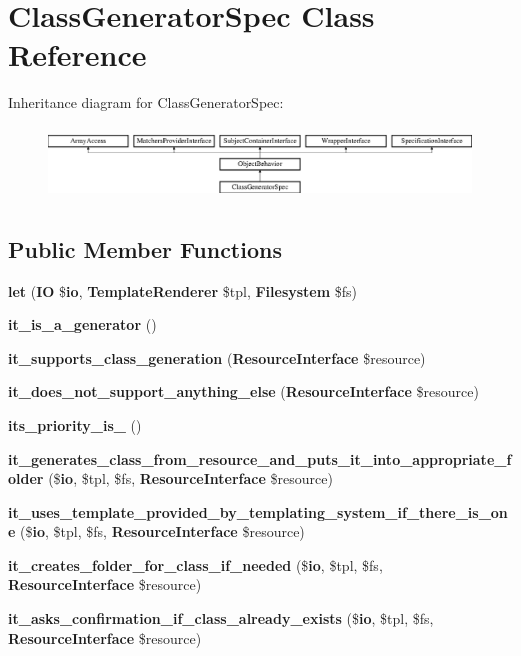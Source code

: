 \section{Class\+Generator\+Spec Class Reference}
\label{classspec_1_1_php_spec_1_1_code_generator_1_1_generator_1_1_class_generator_spec}
Inheritance diagram for Class\+Generator\+Spec\+:\begin{figure}[H]
\begin{center}
\leavevmode
\includegraphics[height=1.953488cm]{classspec_1_1_php_spec_1_1_code_generator_1_1_generator_1_1_class_generator_spec}
\end{center}
\end{figure}
\subsection*{Public Member Functions}
\begin{DoxyCompactItemize}
\item 
{\bf let} ({\bf I\+O} \${\bf io}, {\bf Template\+Renderer} \$tpl, {\bf Filesystem} \$fs)
\item 
{\bf it\+\_\+is\+\_\+a\+\_\+generator} ()
\item 
{\bf it\+\_\+supports\+\_\+class\+\_\+generation} ({\bf Resource\+Interface} \$resource)
\item 
{\bf it\+\_\+does\+\_\+not\+\_\+support\+\_\+anything\+\_\+else} ({\bf Resource\+Interface} \$resource)
\item 
{\bf its\+\_\+priority\+\_\+is\+\_} ()
\item 
{\bf it\+\_\+generates\+\_\+class\+\_\+from\+\_\+resource\+\_\+and\+\_\+puts\+\_\+it\+\_\+into\+\_\+appropriate\+\_\+folder} (\${\bf io}, \$tpl, \$fs, {\bf Resource\+Interface} \$resource)
\item 
{\bf it\+\_\+uses\+\_\+template\+\_\+provided\+\_\+by\+\_\+templating\+\_\+system\+\_\+if\+\_\+there\+\_\+is\+\_\+one} (\${\bf io}, \$tpl, \$fs, {\bf Resource\+Interface} \$resource)
\item 
{\bf it\+\_\+creates\+\_\+folder\+\_\+for\+\_\+class\+\_\+if\+\_\+needed} (\${\bf io}, \$tpl, \$fs, {\bf Resource\+Interface} \$resource)
\item 
{\bf it\+\_\+asks\+\_\+confirmation\+\_\+if\+\_\+class\+\_\+already\+\_\+exists} (\${\bf io}, \$tpl, \$fs, {\bf Resource\+Interface} \$resource)
\end{DoxyCompactItemize}

